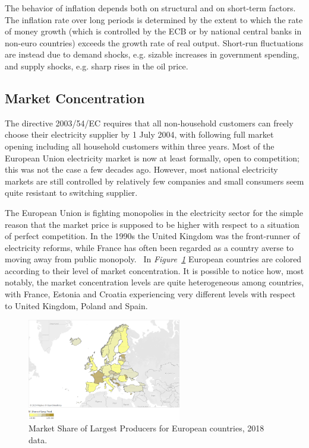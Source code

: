 \documentclass[a4paper,12pt]{book}
\begin{document}
The behavior of inflation depends both on structural and on short-term factors. The inflation rate over long periods is determined by the extent to which the rate of money growth (which is controlled by the ECB or by national central banks in non-euro countries) exceeds the growth rate of real output. Short-run fluctuations are instead due to demand shocks, e.g. sizable increases in government spending, and supply shocks, e.g. sharp rises in the oil price.~\cite{ball1993causes}

\subsection{Market Concentration}

The directive 2003/54/EC requires that all non-household customers can freely choose their electricity supplier by 1 July 2004, with following full market opening including all household customers within three years. Most of the European Union electricity market is now at least formally, open to competition; this was not the case a few decades ago. However, most national electricity markets are still controlled by relatively few companies and small consumers seem quite resistant to switching supplier.~\cite{jamasb2005electricity}

The European Union is fighting monopolies in the electricity sector for the simple reason that the market price is supposed to be higher with respect to a situation of perfect competition. In the 1990s the United Kingdom was the front-runner of electricity reforms, while France has often been regarded as a country averse to moving away from public monopoly.~\cite{fiorio2009reform} In \textit{Figure~\ref{fig:conc}} European countries are colored according to their level of market concentration. It is possible to notice how, most notably, the market concentration levels are quite heterogeneous among countries, with France, Estonia and Croatia experiencing very different levels with respect to United Kingdom, Poland and Spain.

\begin{figure}[tb]
\begin{center}
\captionsetup{justification=centering}
\includegraphics[width=0.6\textwidth]{Images/conc.png}
\caption{Market Share of Largest Producers for European countries, 2018 data. }
\label{fig:conc}
\end{center}
\end{figure}
\end{document}
